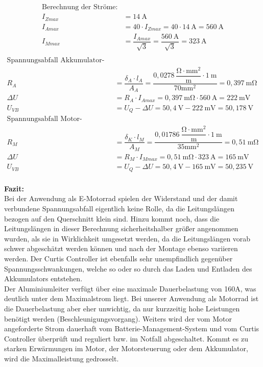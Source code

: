 \begin{align*}
\text{Berechnung der Ströme:} \\[2mm]
I_{Zmax} &= 14~\mathrm{A}	\\[3mm]
I_{Amax} &= 40 \cdot I_{Zmax} = 40 \cdot 14~\mathrm{A} = 560~\mathrm{A} \\[3mm]
I_{Mmax} &= \dfrac{I_{Amax}}{\sqrt{3}} = \dfrac{560~\mathrm{A}}{\sqrt{3}} = 323~\mathrm{A} \\[7mm]
\end{align*}
\newpage
\begin{align*}
\text{Spannungsabfall Akkumulator-Stromkreis:} \\
R_{A} &= \dfrac{\delta_{A} \cdot l_{A}}{A_{A}} = \dfrac{0,0278~\mathrm{\dfrac{\Omega \cdot mm^{2}}{m}}  \cdot 1~\mathrm{m}}{70\mathrm{mm^{2}}} = 0,397~\mathrm{m\Omega} \\[3mm]
\Delta U &= R_{A}\cdot I_{Amax} = 0,397~\mathrm{m\Omega} \cdot 560~\mathrm{A} = 222~\mathrm{mV} \\[3mm]
U_{VB} &= U_{Q} - \Delta U = 50,4~\mathrm{V} - 222~\mathrm{mV} = 50,178~\mathrm{V} \\[9mm]
\text{Spannungsabfall Motor-Stromkreis:} \\
R_{M} &= \dfrac{\delta_{K} \cdot l_{M}}{A_{M}} = \dfrac{0,01786~\mathrm{\dfrac{\Omega \cdot mm^{2}}{m}}  \cdot 1~\mathrm{m}}{35\mathrm{mm^{2}}} = 0,51~\mathrm{m\Omega} \\[3mm]
\Delta U &= R_{M}\cdot I_{Mmax} = 0,51~\mathrm{m\Omega} \cdot 323~\mathrm{A} = 165~\mathrm{mV} \\[3mm]
U_{VB} &= U_{Q} - \Delta U = 50,4~\mathrm{V} - 165~\mathrm{mV} = 50,235~\mathrm{V} \\[5mm]
\end{align*}

\textbf{Fazit:}
\\[2mm]
Bei der Anwendung als E-Motorrad spielen der Widerstand und der damit verbundene Spannungsabfall eigentlich keine Rolle, da die Leitungslängen bezogen auf den Querschnitt klein sind. Hinzu kommt noch, dass die Leitungslängen in dieser Berechnung sicherheitshalber größer angenommen wurden, als sie in Wirklichkeit umgesetzt werden, da die Leitungslängen vorab schwer abgeschätzt werden können und nach der Montage ebenso variieren werden. Der Curtis Controller ist ebenfalls sehr unempfindlich gegenüber Spannungsschwankungen, welche so oder so durch das Laden und Entladen des Akkumulators entstehen. \\
Der Aluminiumleiter verfügt über eine maximale Dauerbelastung von 160A, was deutlich unter dem Maximalstrom liegt. Bei unserer Anwendung als Motorrad ist die Dauerbelastung aber eher unwichtig, da nur kurzzeitig hohe Leistungen benötigt werden (Beschleunigungsvorgang). Weiters wird der vom Motor angeforderte Strom dauerhaft vom Batterie-Management-System und vom Curtis Controller überprüft und reguliert bzw. im Notfall abgeschaltet. Kommt es zu starken Erwärmungen im Motor, der Motorsteuerung oder dem Akkumulator, wird die Maximalleistung gedrosselt.


